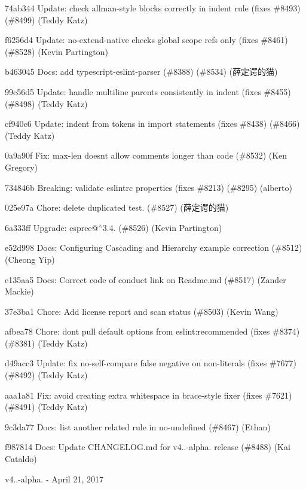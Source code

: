 \begin{DoxyItemize}
\item 74ab344 Update\+: check allman-\/style blocks correctly in indent rule (fixes \#8493) (\#8499) (Teddy Katz)
\item f6256d4 Update\+: no-\/extend-\/native checks global scope refs only (fixes \#8461) (\#8528) (Kevin Partington)
\item b463045 Docs\+: add typescript-\/eslint-\/parser (\#8388) (\#8534) (薛定谔的猫)
\item 99c56d5 Update\+: handle multiline parents consistently in indent (fixes \#8455) (\#8498) (Teddy Katz)
\item cf940c6 Update\+: indent {\ttfamily from} tokens in import statements (fixes \#8438) (\#8466) (Teddy Katz)
\item 0a9a90f Fix\+: max-\/len doesn\textquotesingle{}t allow comments longer than code (\#8532) (Ken Gregory)
\item 734846b Breaking\+: validate eslintrc properties (fixes \#8213) (\#8295) (alberto)
\item 025e97a Chore\+: delete duplicated test. (\#8527) (薛定谔的猫)
\item 6a333ff Upgrade\+: espree@$^\wedge$3.4. (\#8526) (Kevin Partington)
\item e52d998 Docs\+: Configuring Cascading and Hierarchy example correction (\#8512) (Cheong Yip)
\item e135aa5 Docs\+: Correct code of conduct link on Readme.\+md (\#8517) (Zander Mackie)
\item 37e3ba1 Chore\+: Add license report and scan status (\#8503) (Kevin Wang)
\item afbea78 Chore\+: don\textquotesingle{}t pull default options from eslint\+:recommended (fixes \#8374) (\#8381) (Teddy Katz)
\item d49acc3 Update\+: fix no-\/self-\/compare false negative on non-\/literals (fixes \#7677) (\#8492) (Teddy Katz)
\item aaa1a81 Fix\+: avoid creating extra whitespace in brace-\/style fixer (fixes \#7621) (\#8491) (Teddy Katz)
\item 9c3da77 Docs\+: list another related rule in no-\/undefined (\#8467) (Ethan)
\item f987814 Docs\+: Update C\+H\+A\+N\+G\+E\+L\+O\+G.\+md for v4..-\/alpha. release (\#8488) (Kai Cataldo)
\end{DoxyItemize}

v4..-\/alpha. -\/ April 21, 2017


